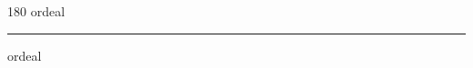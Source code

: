 
\begin{frame}
\begin{center}
\begin{turn}{180}
{\fontsize{2.5cm}{1em}\selectfont ordeal}
\end{turn}
\vspace{1em}\par  
\hrule
\vspace{1em}\par  
{\fontsize{2.5cm}{1em}\selectfont ordeal}
\end{center}
\end{frame}
